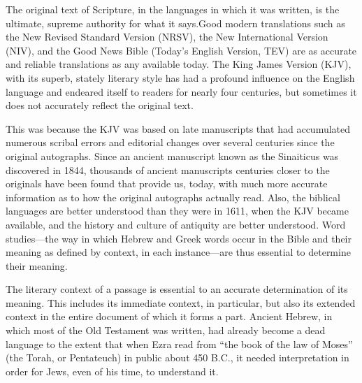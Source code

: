 The original text of Scripture, in the languages in which it was written, is
the ultimate, supreme authority for what it says.Good modern translations
such as the New Revised Standard Version (NRSV), the New International 
Version (NIV), and the Good News Bible (Today's English Version, TEV) are as
accurate and reliable translations as any available today. The King James
Version (KJV), with its superb, stately literary style has had a profound
influence on the English language and endeared itself to readers for nearly
four centuries, but sometimes it does not accurately reflect the original
text.

This was because the KJV was based on late manuscripts that had accumulated
numerous scribal errors and editorial changes over several centuries since
the original autographs. Since an ancient manuscript known as the Sinaiticus
was discovered in 1844, thousands of ancient manuscripts centuries closer to
the originals have been found that provide us, today, with much more
accurate information as to how the original autographs actually read.
Also, the biblical languages are better understood than they were in 1611,
when the KJV became available, and the history and culture of antiquity are
better understood. Word studies---the way in which Hebrew and Greek words
occur in the Bible and their meaning as defined by context, in each
instance---are thus essential to determine their meaning.

The literary context of a passage is essential to an accurate determination
of its meaning. This includes its immediate context, in particular, but also
its extended context in the entire document of which it forms a part.
Ancient Hebrew, in which most of the Old Testament was written, had
already become a dead language to the extent that when Ezra read from ``the
book of the law of Moses'' (the Torah, or Pentateuch) in public about 450
B.C., it needed interpretation in order for Jews, even of his time, to
understand it.

